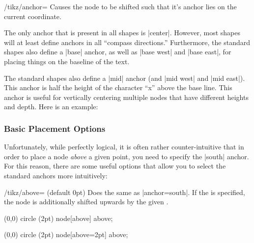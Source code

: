 \begin{key}{/tikz/anchor=}
  Causes the node to be shifted such that it's anchor  lies on the current coordinate.

  The only anchor that is present in all shapes is |center|. However,
  most shapes will at least define anchors in all ``compass
  directions.'' Furthermore, the standard shapes also define a |base|
  anchor, as well as |base west| and |base east|, for placing things on
  the baseline of the text.

  The standard shapes also define a |mid| anchor (and |mid west| and
  |mid east|). This anchor is half the height of the character ``x''
  above the base line. This anchor is useful for vertically centering
  multiple nodes that have different heights and depth. Here is an
  example:
\begin{codeexample}[]
\end{codeexample}
\end{key}



\subsubsection{Basic Placement Options}

Unfortunately, while perfectly logical, it is often rather
counter-intuitive that in order to place a node \emph{above} a given
point, you need to specify the |south| anchor. For this reason, there
are some useful options that allow you to select the standard anchors
more intuitively:

\begin{key}{/tikz/above= (default 0pt)}
  Does the same as |anchor=south|. If the  is specified,
  the node is additionally shifted upwards by the given
  .
\begin{codeexample}[]
\tikz \fill (0,0) circle (2pt) node[above] {above};
\end{codeexample}
\begin{codeexample}[]
\tikz \fill (0,0) circle (2pt) node[above=2pt] {above};
\end{codeexample}
\end{key}

